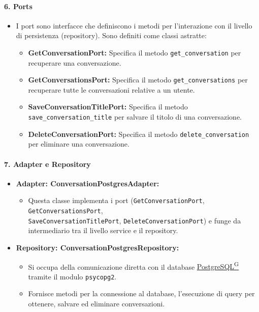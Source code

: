     \paragraph{6. Ports}
    \begin{itemize}
        \item I port sono interfacce che definiscono i metodi per l'interazione con il livello di persistenza (repository). Sono definiti come classi astratte:
        \begin{itemize}
            \item \textbf{GetConversationPort:} Specifica il metodo \texttt{get\_conversation} per recuperare una conversazione.
            \item \textbf{GetConversationsPort:} Specifica il metodo \texttt{get\_conversations} per recuperare tutte le conversazioni relative a un utente.
            \item \textbf{SaveConversationTitlePort:} Specifica il metodo \texttt{save\_conversation\_title} per salvare il titolo di una conversazione.
            \item \textbf{DeleteConversationPort:} Specifica il metodo \texttt{delete\_conversation} per eliminare una conversazione.
        \end{itemize}
    \end{itemize}

    \paragraph{7. Adapter e Repository}
    \begin{itemize}
        \item \textbf{Adapter: ConversationPostgresAdapter:}
        \begin{itemize}
            \item Questa classe implementa i port (\texttt{GetConversationPort}, \texttt{GetConversationsPort}, \\ 
            \texttt{SaveConversationTitlePort}, \texttt{DeleteConversationPort}) e funge da intermediario tra il livello service e il repository.
        \end{itemize}
        \item \textbf{Repository: ConversationPostgresRepository:}
        \begin{itemize}
            \item Si occupa della comunicazione diretta con il database \href{https://code7crusaders.github.io/docs/PB/documentazione_interna/glossario.html#postgresql}{PostgreSQL\textsuperscript{G}} tramite il modulo \texttt{psycopg2}.
            \item Fornisce metodi per la connessione al database, l'esecuzione di query per ottenere, salvare ed eliminare conversazioni.
        \end{itemize}
    \end{itemize}

